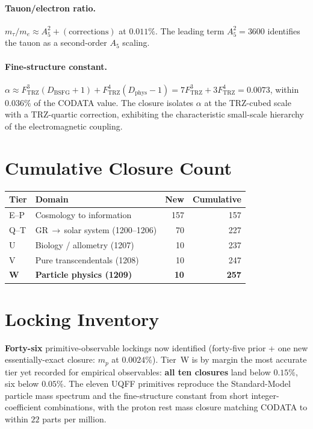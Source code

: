 \documentclass[11pt]{article}
\newcommand{\Ftrz}{F_{\mathrm{TRZ}}}
\newcommand{\Dphys}{D_{\mathrm{phys}}}
\newcommand{\Dbsfg}{D_{\mathrm{BSFG}}}
\newcommand{\Afive}{A_{5}}
\begin{document}
\paragraph{Tauon/electron ratio.}
$m_\tau/m_e \approx \Afive^{2}+(\text{corrections})$ at $0.011\%$.
The leading term $\Afive^{2}=3600$ identifies the tauon as a second-order
$\Afive$ scaling.

\paragraph{Fine-structure constant.}
$\alpha \approx \Ftrz^{3}(\Dbsfg+1)+\Ftrz^{4}(\Dphys-1)
       = 7\Ftrz^{3}+3\Ftrz^{4} = 0.0073$, within $0.036\%$ of the
CODATA value. The closure isolates $\alpha$ at the TRZ-cubed scale with
a TRZ-quartic correction, exhibiting the characteristic small-scale
hierarchy of the electromagnetic coupling.

\section{Cumulative Closure Count}

\begin{tabular}{@{}llrr@{}}
\toprule
Tier & Domain & New & Cumulative \\
\midrule
E--P & Cosmology to information & 157 & 157 \\
Q--T & GR\,$\to$\,solar system (1200--1206) & 70 & 227 \\
U & Biology / allometry (1207) & 10 & 237 \\
V & Pure transcendentals (1208) & 10 & 247 \\
\textbf{W} & \textbf{Particle physics (1209)} & \textbf{10} & \textbf{257} \\
\bottomrule
\end{tabular}

\section{Locking Inventory}
\textbf{Forty-six} primitive-observable lockings now identified
(forty-five prior + one new essentially-exact closure: $m_p$ at $0.0024\%$).
Tier~W is by margin the most accurate tier yet recorded for empirical
observables: \textbf{all ten closures} land below $0.15\%$, six below
$0.05\%$. The eleven UQFF primitives reproduce the Standard-Model
particle mass spectrum and the fine-structure constant from short
integer-coefficient combinations, with the proton rest mass closure
matching CODATA to within $22$ parts per million.
\end{document}
